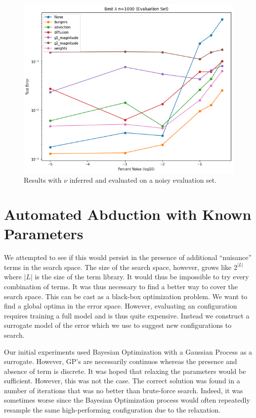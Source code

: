 \documentclass[12pt, fullpage,letterpaper]{article}
\begin{document}
\begin{figure}[!htb]
    \centering
    \includegraphics[width=\textwidth]{reduced-scaling-1000-eval}
    \caption{Results with $\nu$ inferred and evaluated on a noisy evaluation set.}
    \label{fig:reduced-noisy-eval}
\end{figure}

\section{Automated Abduction with Known Parameters }

We attempted to see if this would persist in the presence of additional ``nuisance'' terms in the search space. The size of the search space, however, grows like $2^{|L|}$ where $|L|$ is the size of the term library. It would thus be impossible to try every combination of terms. It was thus necessary to find a better way to cover the search space. This can be cast as a black-box optimization problem. We want to find a global optima in the error space. However, evaluating an configuration requires training a full model and is thus quite expensive. Instead we construct a surrogate model of the error which we use to suggest new configurations to search. 

Our initial experiments used Bayesian Optimization with a Gaussian Process as a surrogate. However, GP's are necessarily continuos whereas the presence and absence of term is discrete. It was hoped that relaxing the parameters would be sufficient. However, this was not the case. The correct solution was found in a number of iterations that was no better than brute-force search. Indeed, it was sometimes worse since the Bayesian Optimization process would often repeatedly resample the same high-performing configuration due to the relaxation.
\end{document}
